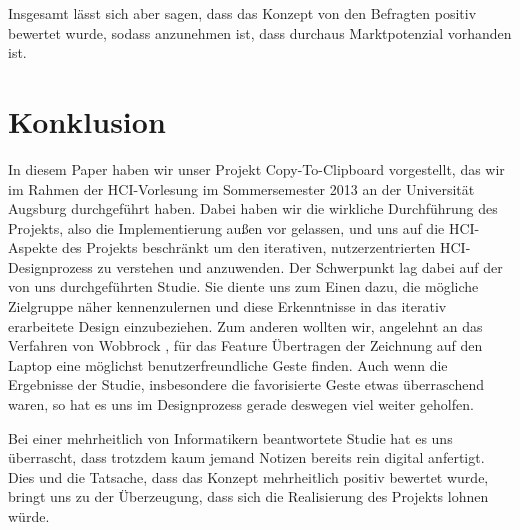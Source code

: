 \documentclass{chi-ext}
\begin{document}
Insgesamt lässt sich aber sagen, dass das Konzept von den Befragten positiv bewertet wurde, sodass anzunehmen ist, dass durchaus Marktpotenzial vorhanden ist.


\section{Konklusion}
In diesem Paper haben wir unser Projekt Copy-To-Clipboard vorgestellt, das wir im Rahmen der HCI-Vorlesung im Sommersemester 2013 an der Universität Augsburg durchgeführt haben. Dabei haben wir die wirkliche Durchführung des Projekts, also die Implementierung außen vor gelassen, und uns auf die HCI-Aspekte des Projekts beschränkt um den iterativen, nutzerzentrierten HCI-Designprozess zu verstehen und anzuwenden.
Der Schwerpunkt lag dabei auf der von uns durchgeführten Studie. Sie diente uns zum Einen dazu, die mögliche Zielgruppe näher kennenzulernen und diese Erkenntnisse in das iterativ erarbeitete Design einzubeziehen. Zum anderen wollten wir, angelehnt an das Verfahren von Wobbrock \cite{Wobbrock}, für das Feature Übertragen der Zeichnung auf den Laptop eine möglichst benutzerfreundliche Geste finden. Auch wenn die Ergebnisse der Studie, insbesondere die favorisierte Geste etwas überraschend waren, so hat es uns im Designprozess gerade deswegen viel weiter geholfen.

Bei einer mehrheitlich von Informatikern beantwortete Studie hat es uns überrascht, dass trotzdem kaum jemand Notizen bereits rein digital anfertigt.
Dies und die Tatsache, dass das Konzept mehrheitlich positiv bewertet wurde, bringt uns zu der Überzeugung, dass sich die Realisierung des Projekts lohnen würde.




\balance


\end{document}
